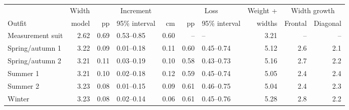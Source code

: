 \begin{tabular}{lrrlrrlrrr}
\toprule
 & Width & \multicolumn{3}{c}{Increment} & \multicolumn{2}{c}{Loss} & Weight + & \multicolumn{2}{c}{Width growth} \\
\cmidrule(lr){3-5}\cmidrule(lr){6-7}\cmidrule(lr){9-10}
Outfit & model & pp & 95\% interval & cm & pp & 95\% interval & widths & Frontal & Diagonal \\
\midrule
Measurement suit & 2.62 & 0.69 & 0.53--0.85 & 0.60 & -- & -- & 3.21 & -- & -- \\
Spring/autumn 1 & 3.22 & 0.09 & 0.01--0.18 & 0.11 & 0.60 & 0.45--0.74 & 5.12 & 2.6 & 2.1 \\
Spring/autumn 2 & 3.21 & 0.11 & 0.03--0.19 & 0.10 & 0.58 & 0.43--0.73 & 5.16 & 2.7 & 2.2 \\
Summer 1 & 3.21 & 0.10 & 0.02--0.18 & 0.12 & 0.59 & 0.45--0.74 & 5.05 & 2.4 & 2.4 \\
Summer 2 & 3.23 & 0.08 & 0.01--0.15 & 0.09 & 0.61 & 0.46--0.75 & 5.04 & 2.4 & 2.3 \\
Winter & 3.23 & 0.08 & 0.02--0.14 & 0.06 & 0.61 & 0.45--0.76 & 5.28 & 2.8 & 2.2 \\
\bottomrule
\end{tabular}
